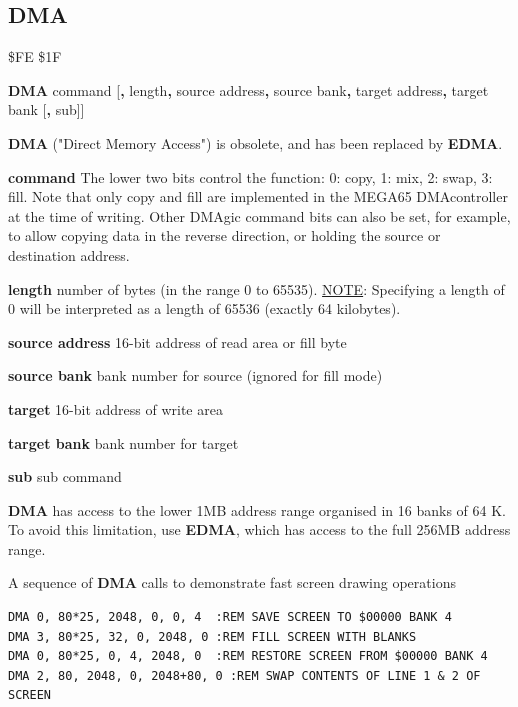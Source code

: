 \subsection{DMA}
\label{BASIC 65 Commands!DMA}
\begin{description}[leftmargin=2cm,style=nextline]
\item [Token:] \$FE \$1F
\item [Format:] {\bf DMA} command [{\bf,} length{\bf,} source address{\bf,}
                 source bank{\bf,} target address{\bf,} target bank
                 [{\bf,} sub]]
\item [Usage:]
   {\bf DMA} ("Direct Memory Access") is obsolete,
   and has been replaced by {\bf EDMA}.

   {\bf command} The lower two bits control the function: 0: copy, 1: mix, 2: swap, 3: fill. Note that only copy and fill are implemented in the MEGA65 DMAcontroller at the time of writing.  Other DMAgic command bits can also be set, for example, to allow copying data in the reverse direction, or holding the source or destination address.

   {\bf length} number of bytes (in the range 0 to 65535). \underline{NOTE}: Specifying a length of 0 will be interpreted as a length of 65536 (exactly 64 kilobytes).

   {\bf source address} 16-bit address of read area or fill byte

   {\bf source bank} bank number for source (ignored for fill mode)

   {\bf target} 16-bit address of write area

   {\bf target bank} bank number for target

   {\bf sub} sub command

\item [Remarks:]
{\bf DMA} has access to the lower 1MB address range
organised in 16 banks of 64 K. To avoid this limitation, use
{\bf EDMA}, which has access to the full 256MB address range.

\item [Examples:] A sequence of {\bf DMA} calls to demonstrate fast screen drawing operations
\begin{tcolorbox}[colback=black,coltext=white]
\verbatimfont{\codefont}
\begin{verbatim}
DMA 0, 80*25, 2048, 0, 0, 4  :REM SAVE SCREEN TO $00000 BANK 4
DMA 3, 80*25, 32, 0, 2048, 0 :REM FILL SCREEN WITH BLANKS
DMA 0, 80*25, 0, 4, 2048, 0  :REM RESTORE SCREEN FROM $00000 BANK 4
DMA 2, 80, 2048, 0, 2048+80, 0 :REM SWAP CONTENTS OF LINE 1 & 2 OF SCREEN
\end{verbatim}
\end{tcolorbox}
\end{description}

